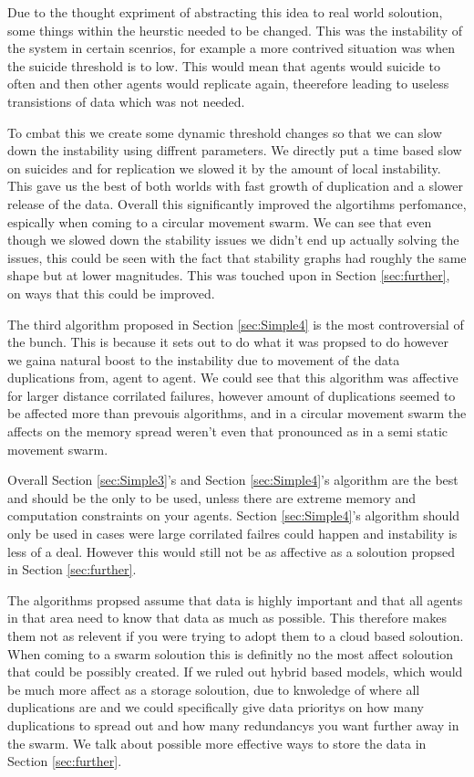 \documentclass{UoYCSproject}
\begin{document}
Due to the thought expriment of abstracting this idea to real world soloution, some things within the heurstic needed to be changed.
This was the instability of the system in certain scenrios, for example a more contrived situation was when the suicide threshold is to low.
This would mean that agents would suicide to often and then other agents would replicate again, theerefore leading to useless transistions of data which was not needed.

To cmbat this we create some dynamic threshold changes so that we can slow down the instability using diffrent parameters.
We directly put a time based slow on suicides and for replication we slowed it by the amount of local instability.
This gave us the best of both worlds with fast growth of duplication and a slower release of the data.
Overall this significantly improved the algortihms perfomance, espically when coming to a circular movement swarm.
We can see that even though we slowed down the stability issues we didn't end up actually solving the issues, this could be seen with the fact that stability graphs had roughly the same shape but at lower magnitudes.
This was touched upon in Section \ref{sec:further}, on ways that this could be improved.

The third algorithm proposed in Section \ref{sec:Simple4} is the most controversial of the bunch.
This is because it sets out to do what it was propsed to do however we gaina natural boost to the instability due to movement of the data duplications from, agent to agent.
We could see that this algorithm was affective for larger distance corrilated failures, however amount of duplications seemed to be affected more than prevouis algorithms, and in a circular movement swarm the affects on the memory spread weren't even that pronounced as in a semi static movement swarm.

Overall Section \ref{sec:Simple3}'s and Section \ref{sec:Simple4}'s algorithm are the best and should be the only to be used, unless there are extreme memory and computation constraints on your agents.
Section \ref{sec:Simple4}'s algorithm should only be used in cases were large corrilated failres could happen and instability is less of a deal.
However this would still not be as affective as a soloution propsed in Section \ref{sec:further}.

The algorithms propsed assume that data is highly important and that all agents in that area need to know that data as much as possible.
This therefore makes them not as relevent if you were trying to adopt them to a cloud based soloution.
When coming to a swarm soloution this is definitly no the most affect soloution that could be possibly created.
If we ruled out hybrid based models, which would be much more affect as a storage soloution, due to knwoledge of where all duplications are and we could specifically give data prioritys on how many duplications to spread out and how many redundancys you want further away in the swarm.
We talk about possible more effective ways to store the data in Section \ref{sec:further}.
\end{document}
